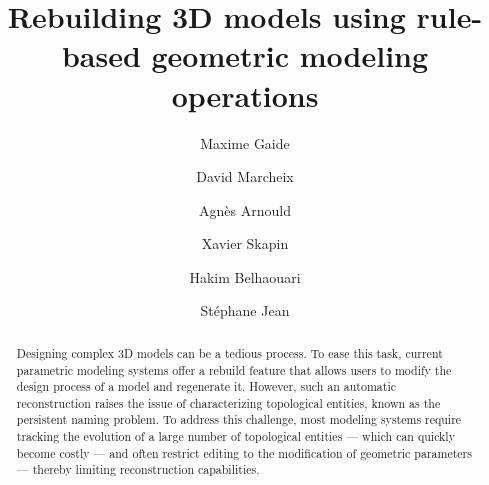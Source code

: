 \documentclass[authoryear,preprint,review,12pt,x11names]{elsarticle}
\begin{document}
\begin{frontmatter}



	\title{Rebuilding 3D models using rule-based geometric modeling operations}

	\author[lias]{Maxime Gaide}
	\author[lias]{David Marcheix}
	\author[xlim]{Agn\`{e}s Arnould}
	\author[xlim]{Xavier Skapin}
	\author[xlim]{Hakim Belhaouari}
	\author[lias]{St\'{e}phane Jean}



	\begin{abstract}
		\begin{linenumbers}
		  Designing complex 3D models can be a tedious process. %
		  To ease this task, current parametric modeling systems offer a rebuild
			feature that allows users to modify the design process of a model and
			regenerate it. %
		  However, such an automatic reconstruction raises the issue of
			characterizing topological entities, known as the persistent naming
			problem. %
		  To address this challenge, most modeling systems require tracking the
			evolution of a large number of topological entities — which can quickly
			become costly — and often restrict editing to the modification of
			geometric parameters — thereby limiting reconstruction capabilities. %


\end{linenumbers}
\end{abstract}
\end{frontmatter}
\end{document}
